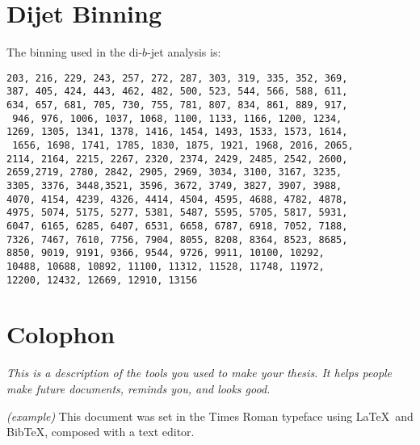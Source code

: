 
\appendix
\chapter{Dijet Binning}
\label{app-dijet_bins}

\noindent
The binning used in the di-$b$-jet analysis is:
\begin{verbatim}
203, 216, 229, 243, 257, 272, 287, 303, 319, 335, 352, 369,
387, 405, 424, 443, 462, 482, 500, 523, 544, 566, 588, 611, 
634, 657, 681, 705, 730, 755, 781, 807, 834, 861, 889, 917,
 946, 976, 1006, 1037, 1068, 1100, 1133, 1166, 1200, 1234, 
1269, 1305, 1341, 1378, 1416, 1454, 1493, 1533, 1573, 1614,
 1656, 1698, 1741, 1785, 1830, 1875, 1921, 1968, 2016, 2065, 
2114, 2164, 2215, 2267, 2320, 2374, 2429, 2485, 2542, 2600, 
2659,2719, 2780, 2842, 2905, 2969, 3034, 3100, 3167, 3235, 
3305, 3376, 3448,3521, 3596, 3672, 3749, 3827, 3907, 3988, 
4070, 4154, 4239, 4326, 4414, 4504, 4595, 4688, 4782, 4878, 
4975, 5074, 5175, 5277, 5381, 5487, 5595, 5705, 5817, 5931, 
6047, 6165, 6285, 6407, 6531, 6658, 6787, 6918, 7052, 7188, 
7326, 7467, 7610, 7756, 7904, 8055, 8208, 8364, 8523, 8685, 
8850, 9019, 9191, 9366, 9544, 9726, 9911, 10100, 10292, 
10488, 10688, 10892, 11100, 11312, 11528, 11748, 11972, 
12200, 12432, 12669, 12910, 13156
\end{verbatim}


\chapter{Colophon}
\label{appendixlabel3}
\textit{This is a description of the tools you used to make your thesis. It helps people make future documents, reminds you, and looks good.}

\textit{(example)} This document was set in the Times Roman typeface using \LaTeX\ and Bib\TeX , composed with a text editor. 

